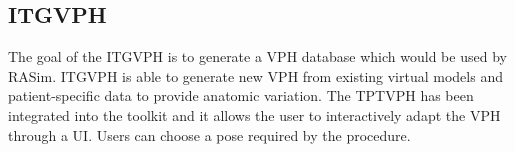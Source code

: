 \subsection{ITGVPH}
\label{conclu:herramienta}


The goal of the \acs{ITGVPH} is to generate a \acs{VPH} database which would be used by \acs{RASim}. \acs{ITGVPH} is able to generate new \acs{VPH} from existing virtual models and patient-specific data to provide anatomic variation. The \acs{TPTVPH} has been integrated into the toolkit and it allows the user to interactively adapt the VPH through a UI. Users can choose a pose required by the procedure.

 



